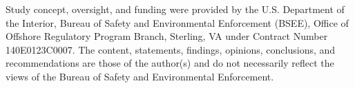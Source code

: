 \documentclass{ifacconf}
\begin{document}
 \begin{ack}
Study concept, oversight, and funding were provided by the U.S. Department of the Interior, Bureau of Safety and Environmental Enforcement (BSEE), Office of Offshore Regulatory Program Branch, Sterling, VA under Contract Number 140E0123C0007. The content, statements, findings, opinions, conclusions, and recommendations are those of the author(s) and do not necessarily reflect the views of the Bureau of Safety and Environmental Enforcement.
\end{ack}

           
\end{document}
